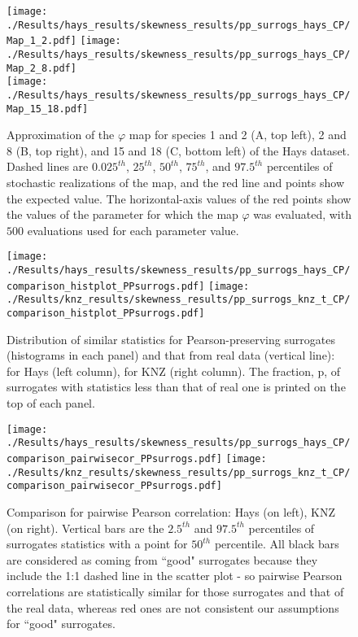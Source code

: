 \documentclass[letterpaper,11pt]{article}
\begin{document}
\begin{figure}
\texttt{[image: ./Results/hays\_results/skewness\_results/pp\_surrogs\_hays\_CP/Map\_1\_2.pdf]} 
\texttt{[image: ./Results/hays\_results/skewness\_results/pp\_surrogs\_hays\_CP/Map\_2\_8.pdf]} \\
\texttt{[image: ./Results/hays\_results/skewness\_results/pp\_surrogs\_hays\_CP/Map\_15\_18.pdf]}
\caption{Approximation of the $\varphi$ map for species 1 and 2 (A, top left), 2 and 8 (B, top right), and 15 and 18 (C, bottom left) 
of the Hays dataset. Dashed lines are $0.025^{th}$, $25^{th}$, $50^{th}$, $75^{th}$, and $97.5^{th}$ percentiles 
of stochastic realizations of the map, and
the red line and points show the expected value. The horizontal-axis values of the red 
points show the values of the
parameter for which the map $\varphi$ was evaluated, with $500$ evaluations used for
each parameter value.}\label{fig:varphiexample}
\end{figure}


\begin{figure}
\texttt{[image: ./Results/hays\_results/skewness\_results/pp\_surrogs\_hays\_CP/comparison\_histplot\_PPsurrogs.pdf]}
\texttt{[image: ./Results/knz\_results/skewness\_results/pp\_surrogs\_knz\_t\_CP/comparison\_histplot\_PPsurrogs.pdf]}  
\caption{Distribution of similar statistics for Pearson-preserving surrogates (histograms in each panel) and that from real data (vertical line): for Hays (left column), for KNZ (right column). The fraction, p, of surrogates with statistics less than that of real one is printed on the top of each panel.}\label{fig:check_cov_var_vr}
\end{figure}

\begin{figure}
\texttt{[image: ./Results/hays\_results/skewness\_results/pp\_surrogs\_hays\_CP/comparison\_pairwisecor\_PPsurrogs.pdf]}  
\texttt{[image: ./Results/knz\_results/skewness\_results/pp\_surrogs\_knz\_t\_CP/comparison\_pairwisecor\_PPsurrogs.pdf]} 
\caption{Comparison for pairwise Pearson correlation: Hays (on left), KNZ (on right). Vertical bars are the $2.5^{th}$ and $97.5^{th}$ percentiles of surrogates statistics with a point for $50^{th}$ percentile. All black bars are considered as coming from ``good" surrogates
because they include the 1:1 dashed line in the scatter plot - so pairwise Pearson correlations are statistically similar for those surrogates and that of the real data, whereas red ones are not consistent our assumptions for ``good" surrogates.}\label{fig:check_pairwisecor}
\end{figure}
\end{document}
